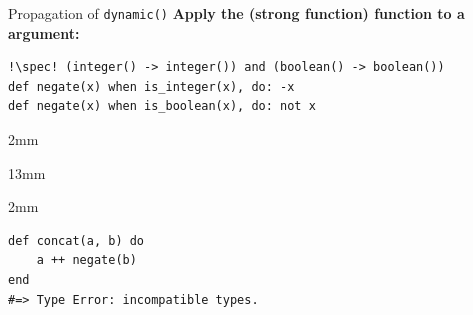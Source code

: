 \begin{frame}[fragile]{Propagation of \texttt{dynamic()}}
\textbf{\color{darkslateblue}Apply the (strong function)  function to a  argument:}
\vspace{-4mm}
\begin{block}{\vspace{-5mm}}
\begin{verbatim}
!\spec! (integer() -> integer()) and (boolean() -> boolean())
def negate(x) when is_integer(x), do: -x
def negate(x) when is_boolean(x), do: not x
\end{verbatim}
\vspace{-6.1mm}
\begin{overlayarea}{\textwidth}{2mm}
\end{overlayarea}
\hfill
\vspace{1.7mm}
\hfill
\end{block}
\pause\pause\vspace{-6mm}
\begin{block}{\vspace{-6mm}}\vspace{-2mm}
\begin{overlayarea}{\textwidth}{13mm}
\end{overlayarea}
\vspace{-6.5mm}
\begin{overlayarea}{\textwidth}{2mm}
\end{overlayarea}
\hfill
\vspace{1.7mm}
\end{block}
\pause\pause\pause\pause\pause\pause\pause\vspace{-6mm}
\begin{block}{\vspace{-5mm}}
\begin{verbatim}
def concat(a, b) do
    a ++ negate(b) 
end
#=> Type Error: incompatible types.
\end{verbatim}
\end{block}
\end{frame}
